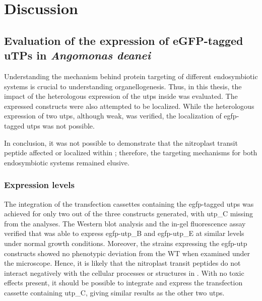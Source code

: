 
\chapter{Discussion}
\section{Evaluation of the expression of eGFP-tagged uTPs in \textit{Angomonas deanei}}
Understanding the mechanism behind protein targeting of different endosymbiotic systems is crucial to understanding organellogenesis. Thus, in this thesis, the impact of the heterologous expression of the \gls{utp}s inside  was evaluated. The expressed constructs were also attempted to be localized. While the heterologous expression of two \gls{utp}s, although weak, was verified, the localization of \gls{egfp}-tagged \gls{utp}s was not possible. 

In conclusion, it was not possible to demonstrate that the nitroplast transit peptide affected or localized within ; therefore, the targeting mechanisms for both endosymbiotic systems remained elusive. 
\subsection{Expression levels}
The integration of the transfection cassettes containing the \gls{egfp}-tagged \gls{utp}s was achieved for only two out of the three constructs generated, with \gls{utp_C} missing from the analyses. The Western blot analysis and the in-gel fluorescence assay verified that  was able to express \gls{egfp}-\gls{utp_B} and \gls{egfp}-\gls{utp_E} at similar levels under normal growth conditions. Moreover, the strains expressing the \gls{egfp}-\gls{utp} constructs showed no phenotypic deviation from the \gls{WT} when examined under the microscope. Hence, it is likely that the nitroplast transit peptides do not interact negatively with the cellular processes or structures in . With no toxic effects present, it should be possible to integrate and express the transfection cassette containing \gls{utp_C}, giving similar results as the other two \gls{utp}s.   

